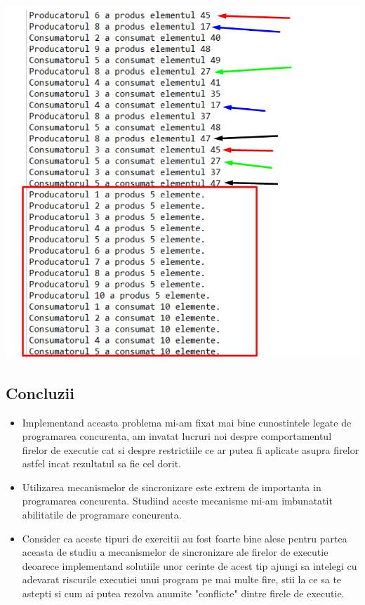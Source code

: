 \documentclass[14pt]{article}
\begin{document}
\begin{center}\includegraphics[height=4.3 in, width = 3.5 in]{output_cons.png}
\end{center}

\subsection{\textbf{Concluzii}}

\begin{itemize}
\item Implementand aceasta problema mi-am fixat mai bine cunostintele legate de programarea concurenta, am invatat lucruri noi despre comportamentul firelor de executie cat si despre restrictiile ce ar putea fi aplicate asupra firelor astfel incat rezultatul sa fie cel dorit.

\item Utilizarea mecanismelor de sincronizare este extrem de importanta in programarea concurenta. Studiind aceste mecanisme mi-am imbunatatit abilitatile de programare concurenta.


\item Consider ca aceste tipuri de exercitii au fost foarte bine alese pentru partea aceasta de studiu a mecanismelor de sincronizare ale firelor de executie deoarece implementand solutiile unor  cerinte de acest tip ajungi sa intelegi cu adevarat riscurile executiei unui program pe mai multe fire, stii la ce sa te astepti si cum ai putea rezolva anumite "conflicte" dintre firele de executie.

\end{itemize}
\end{document}
